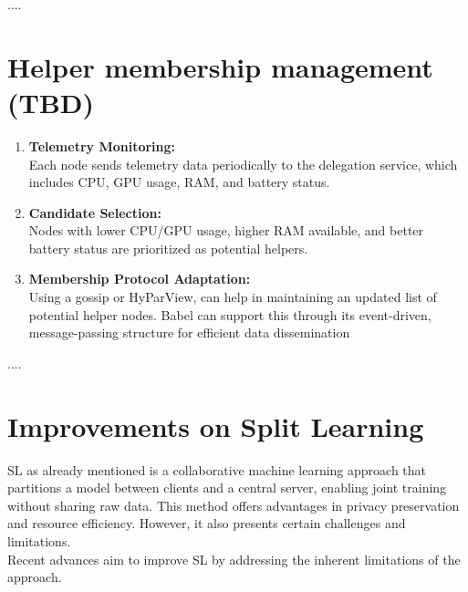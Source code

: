 ....


\section{Helper membership management (TBD)}
\label{sec:helper_membership_management}

\begin{enumerate}
	\item \textbf{Telemetry Monitoring:} \\ Each node sends telemetry data periodically to the delegation service, which includes CPU, GPU usage, RAM, and battery status.

	\item \textbf{Candidate Selection: } \\ Nodes with lower CPU/GPU usage, higher RAM available, and better battery status are prioritized as potential helpers.
	
	\item \textbf{Membership Protocol Adaptation:} \\ Using a gossip or HyParView, can help in maintaining an updated list of potential helper nodes. Babel can support this through its event-driven, message-passing structure for efficient data dissemination​


\end{enumerate}

....

\section{Improvements on Split Learning}
\label{sec:improvements_on_sl}

\gls{SL} as already mentioned is a collaborative machine learning approach that partitions a model between clients and a central server, enabling joint training without sharing raw data. This method offers advantages in privacy preservation and resource efficiency. However, it also presents certain challenges and limitations.
	\\
	Recent advances aim to improve \gls{SL} by addressing the inherent limitations of the approach.

